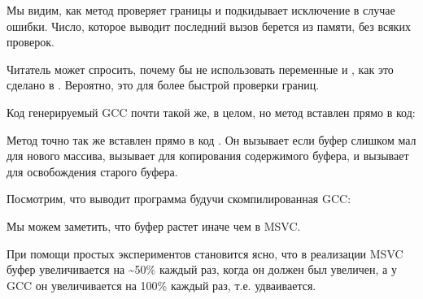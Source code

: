 Мы видим, как метод  проверяет границы и подкидывает исключение в случае ошибки.
Число, которое выводит последний вызов \printf берется из памяти, без всяких
проверок.

Читатель может спросить, почему бы не использовать переменные  и , 
как это сделано в .
Вероятно, это для более быстрой проверки границ.

Код генерируемый GCC почти такой же, в целом, но метод  вставлен прямо в код:



Метод  точно так же вставлен прямо в код \main.
Он вызывает  если буфер слишком мал для нового массива, вызывает  
для копирования содержимого буфера,
и вызывает  для освобождения старого буфера.

Посмотрим, что выводит программа будучи скомпилированная GCC:



Мы можем заметить, что буфер растет иначе чем в MSVC.

При помощи простых экспериментов становится ясно, что в реализации MSVC буфер увеличивается
на \textasciitilde{}50\% каждый раз,
когда он должен был увеличен,
а у GCC он увеличивается на 100\% каждый раз, т.е. удваивается.


